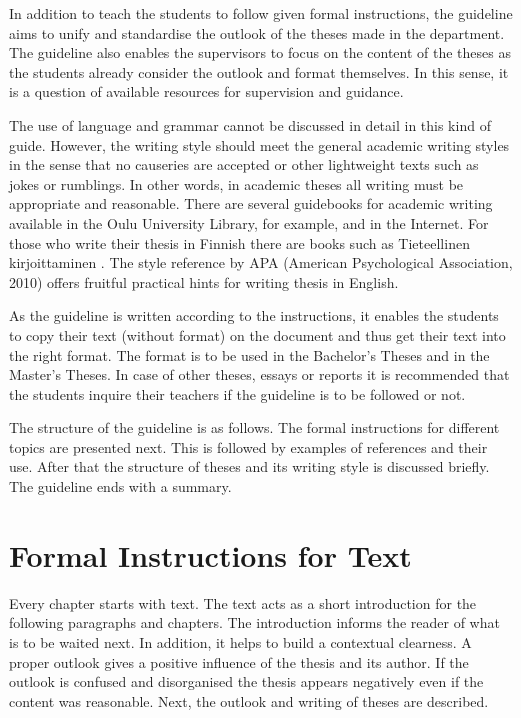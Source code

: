 \documentclass[a4paper,12pt]{article}
\begin{document}
In addition to teach the students to follow given formal instructions, the guideline aims to unify and standardise the outlook of the theses made in the department. The guideline also enables the supervisors to focus on the content of the theses as the students already consider the outlook and format themselves. In this sense, it is a question of available resources for supervision and guidance.

The use of language and grammar cannot be discussed in detail in this kind of guide. However, the writing style should meet the general academic writing styles in the sense that no causeries are accepted or other lightweight texts such as jokes or rumblings. In other words, in academic theses all writing must be appropriate and reasonable. There are several guidebooks for academic writing available in the Oulu University Library, for example, and in the Internet. For those who write their thesis in Finnish there are books such as Tieteellinen kirjoittaminen \parencite{Rodriguez}. The style reference by APA (American Psychological Association, 2010) offers fruitful practical hints for writing thesis in English.

As the guideline is written according to the instructions, it enables the students to copy their text (without format) on the document and thus get their text into the right format. The format is to be used in the Bachelor’s Theses and in the Master’s Theses. In case of other theses, essays or reports it is recommended that the students inquire their teachers if the guideline is to be followed or not.

The structure of the guideline is as follows. The formal instructions for different topics are presented next. This is followed by examples of references and their use. After that the structure of theses and its writing style is discussed briefly. The guideline ends with a summary.

\newpage
\section{Formal Instructions for Text}
Every chapter starts with text. The text acts as a short introduction for the following paragraphs and chapters. The introduction informs the reader of what is to be waited next. In addition, it helps to build a contextual clearness. A proper outlook gives a positive influence of the thesis and its author. If the outlook is confused and disorganised the thesis appears negatively even if the content was reasonable. Next, the outlook and writing of theses are described.
\end{document}

